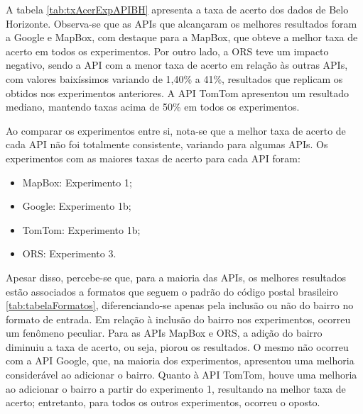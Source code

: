 A tabela \ref{tab:txAcerExpAPIBH} apresenta a taxa de acerto dos dados de Belo Horizonte. Observa-se que as APIs que alcançaram os melhores resultados foram a Google e MapBox, com destaque para a MapBox, que obteve a melhor taxa de acerto em todos os experimentos. Por outro lado, a ORS teve um impacto negativo, sendo a API com a menor taxa de acerto em relação às outras APIs, com valores baixíssimos variando de 1,40\% a 41\%, resultados que replicam os obtidos nos experimentos anteriores. A API TomTom apresentou um resultado mediano, mantendo taxas acima de 50\% em todos os experimentos.

Ao comparar os experimentos entre si, nota-se que a melhor taxa de acerto de cada API não foi totalmente consistente, variando para algumas APIs. Os experimentos com as maiores taxas de acerto para cada API foram:
\begin{itemize}
  \item MapBox: Experimento 1;
  \item Google: Experimento 1b;
  \item TomTom: Experimento 1b;
  \item ORS: Experimento 3.
\end{itemize} 

Apesar disso, percebe-se que, para a maioria das APIs, os melhores resultados estão associados a formatos que seguem o padrão do código postal brasileiro \ref{tab:tabelaFormatos}, diferenciando-se apenas pela inclusão ou não do bairro no formato de entrada. Em relação à inclusão do bairro nos experimentos, ocorreu um fenômeno peculiar. Para as APIs MapBox e ORS, a adição do bairro diminuiu a taxa de acerto, ou seja, piorou os resultados. O mesmo não ocorreu com a API Google, que, na maioria dos experimentos, apresentou uma melhoria considerável ao adicionar o bairro. Quanto à API TomTom, houve uma melhoria ao adicionar o bairro a partir do experimento 1, resultando na melhor taxa de acerto; entretanto, para todos os outros experimentos, ocorreu o oposto.


